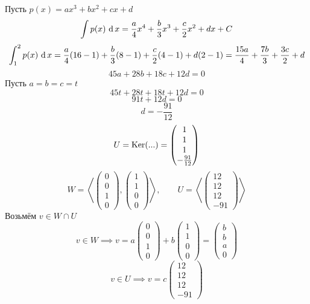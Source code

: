Пусть $ p(x) = ax^3 + bx^2 + cx + d $
$$ \uint{p(x)} = \frac{a}4x^4 + \frac{b}3x^3 + \half[c]x^2 + dx + C $$
$$ \dint12{p(x)} = \frac{a}4(16 - 1) + \frac{b}3(8 - 1) + \half[c](4 - 1) + d(2 - 1) = \frac{15a}4 + \frac{7b}3 + \half[3c] + d $$
$$ 45a + 28b + 18c + 12d = 0 $$
Пусть $ a = b = c = t $
$$ 45t + 28t + 18t + 12d = 0 $$
$$ 91t + 12d = 0 $$
$$ d = -\frac{91}{12} $$
$$ U = \Ker(...) =
\begin{pmatrix}
	1 \\
    1 \\
    1 \\
    -\frac{91}{12}
\end{pmatrix} $$
$$ W = \left\langle
\begin{pmatrix}
	0 \\
    0 \\
    1 \\
    0
\end{pmatrix},
\begin{pmatrix}
	1 \\
    1 \\
    0 \\
    0
\end{pmatrix} \right\rangle, \qquad U = \left\langle
\begin{pmatrix}
	12 \\
    12 \\
    12 \\
    -91
\end{pmatrix} \right\rangle $$
Возьмём $ v \in W \cap U $
$$ v \in W \implies v = a
\begin{pmatrix}
	0 \\
    0 \\
    1 \\
    0
\end{pmatrix} + b
\begin{pmatrix}
	1 \\
    1 \\
    0 \\
    0
\end{pmatrix} =
\begin{pmatrix}
	b \\
    b \\
    a \\
    0
\end{pmatrix} $$
$$ v \in U \implies v = c
\begin{pmatrix}
	12 \\
    12 \\
    12 \\
    -91
\end{pmatrix} $$
